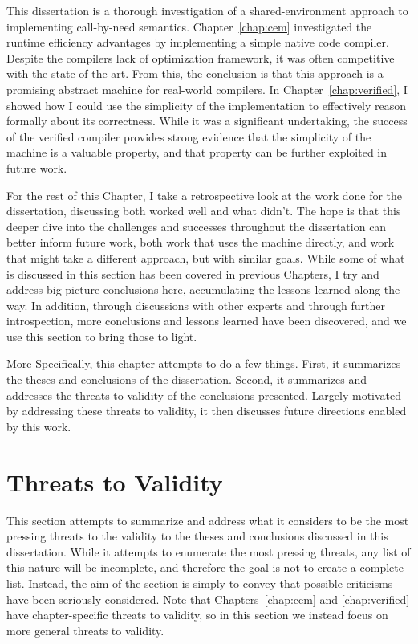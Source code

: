 This dissertation is a thorough investigation of a shared-environment approach
to implementing call-by-need semantics. Chapter~\ref{chap:cem} investigated the
runtime efficiency advantages by implementing a simple native code compiler.
Despite the compilers lack of optimization framework, it was often competitive
with the state of the art. From this, the conclusion is that this approach is a
promising abstract machine for real-world compilers. In
Chapter~\ref{chap:verified}, I showed how I could use the simplicity of the
implementation to effectively reason formally about its correctness. While it
was a significant undertaking, the success of the verified compiler provides
strong evidence that the simplicity of the machine is a valuable property, and
that property can be further exploited in future work.

For the rest of this Chapter, I take a retrospective look at the work done for
the dissertation, discussing both worked well and what didn't. The hope is that
this deeper dive into the challenges and successes throughout the dissertation
can better inform future work, both work that uses the \ce machine directly, and
work that might take a different approach, but with similar goals. While some of
what is discussed in this section has been covered in previous Chapters, I try
and address big-picture conclusions here, accumulating the lessons learned along
the way. In addition, through discussions with other experts and through further
introspection, more conclusions and lessons learned have been discovered, and we
use this section to bring those to light. 

More Specifically, this chapter attempts to do a few things. First, it
summarizes the theses and conclusions of the dissertation. Second, it summarizes
and addresses the threats to validity of the conclusions presented.  Largely
motivated by addressing these threats to validity, it then discusses future
directions enabled by this work. 

\section{Threats to Validity}

This section attempts to summarize and address what it considers to be the most
pressing threats to the validity to the theses and conclusions discussed in this
dissertation. While it attempts to enumerate the most pressing threats, any list
of this nature will be incomplete, and therefore the goal is not to create a
complete list. Instead, the aim of the section is simply to convey that possible
criticisms have been seriously considered. Note that Chapters~\ref{chap:cem} and
\ref{chap:verified} have chapter-specific threats to validity, so in this
section we instead focus on more general threats to validity. 

